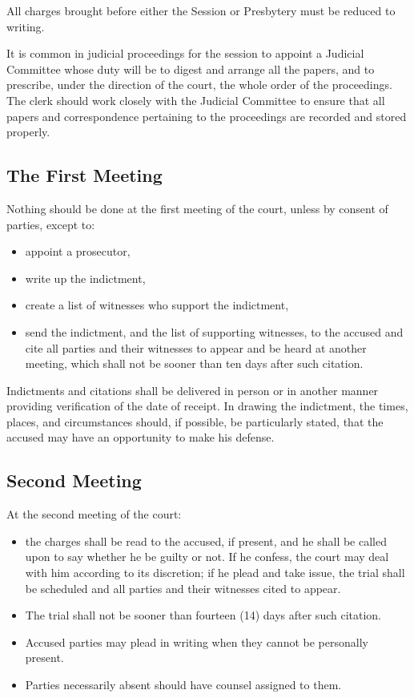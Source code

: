 \documentclass[
]{book}
\providecommand{\tightlist}{%
  \setlength{\itemsep}{0pt}\setlength{\parskip}{0pt}}
\begin{document}
All charges brought before either the Session or Presbytery must be reduced to writing.

It is common in judicial proceedings for the session to appoint a Judicial Committee whose duty will be to digest and arrange all the papers, and to prescribe, under the direction of the court, the whole order of the proceedings. The clerk should work closely with the Judicial Committee to ensure that all papers and correspondence pertaining to the proceedings are recorded and stored properly.

\hypertarget{the-first-meeting}{%
\subsection{The First Meeting}\label{the-first-meeting}}

Nothing should be done at the first meeting of the court, unless by consent of parties, except to:

\begin{itemize}
\tightlist
\item
  appoint a prosecutor,
\item
  write up the indictment,
\item
  create a list of witnesses who support the indictment,
\item
  send the indictment, and the list of supporting witnesses, to the accused and cite all parties and their witnesses to appear and be heard at another meeting, which shall not be sooner than ten days after such citation.
\end{itemize}

Indictments and citations shall be delivered in person or in another manner providing verification of the date of receipt. In drawing the indictment, the times, places, and circumstances should, if possible, be particularly stated, that the accused may have an opportunity to make his defense.

\hypertarget{second-meeting}{%
\subsection{Second Meeting}\label{second-meeting}}

At the second meeting of the court:

\begin{itemize}
\tightlist
\item
  the charges shall be read to the accused, if present, and he shall be called upon to say whether he be guilty or not. If he confess, the court may deal with him according to its discretion; if he plead and take issue, the trial shall be scheduled and all parties and their witnesses cited to appear.
\item
  The trial shall not be sooner than fourteen (14) days after such citation.
\item
  Accused parties may plead in writing when they cannot be personally present.
\item
  Parties necessarily absent should have counsel assigned to them.
\end{itemize}
\end{document}

